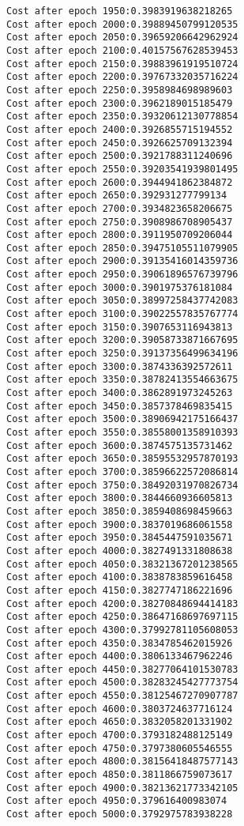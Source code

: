 \documentclass[11pt]{article}
\begin{document}
\begin{Verbatim}[commandchars=\\\{\}]
Cost after epoch 1950:0.3983919638218265
Cost after epoch 2000:0.39889450799120535
Cost after epoch 2050:0.39659206642962924
Cost after epoch 2100:0.40157567628539453
Cost after epoch 2150:0.39883961919510724
Cost after epoch 2200:0.39767332035716224
Cost after epoch 2250:0.3958984698989603
Cost after epoch 2300:0.3962189015185479
Cost after epoch 2350:0.39320612130778854
Cost after epoch 2400:0.3926855715194552
Cost after epoch 2450:0.3926625709132394
Cost after epoch 2500:0.3921788311240696
Cost after epoch 2550:0.39203541939801495
Cost after epoch 2600:0.3944941862384872
Cost after epoch 2650:0.392931277799134
Cost after epoch 2700:0.3934823658206675
Cost after epoch 2750:0.3908986708905437
Cost after epoch 2800:0.3911950709206044
Cost after epoch 2850:0.39475105511079905
Cost after epoch 2900:0.39135416014359736
Cost after epoch 2950:0.39061896576739796
Cost after epoch 3000:0.3901975376181084
Cost after epoch 3050:0.38997258437742083
Cost after epoch 3100:0.39022557835767774
Cost after epoch 3150:0.3907653116943813
Cost after epoch 3200:0.39058733871667695
Cost after epoch 3250:0.39137356499634196
Cost after epoch 3300:0.3874336392572611
Cost after epoch 3350:0.38782413554663675
Cost after epoch 3400:0.3862891973245263
Cost after epoch 3450:0.3857378469835415
Cost after epoch 3500:0.38906942175166437
Cost after epoch 3550:0.38558001358910393
Cost after epoch 3600:0.3874575135731462
Cost after epoch 3650:0.38595532957870193
Cost after epoch 3700:0.38596622572086814
Cost after epoch 3750:0.38492031970826734
Cost after epoch 3800:0.3844660936605813
Cost after epoch 3850:0.3859408698459663
Cost after epoch 3900:0.3837019686061558
Cost after epoch 3950:0.3845447591035671
Cost after epoch 4000:0.3827491331808638
Cost after epoch 4050:0.38321367201238565
Cost after epoch 4100:0.3838783859616458
Cost after epoch 4150:0.3827747186221696
Cost after epoch 4200:0.38270848694414183
Cost after epoch 4250:0.38647168697697115
Cost after epoch 4300:0.37992781105608053
Cost after epoch 4350:0.3834785462015926
Cost after epoch 4400:0.3806133467962246
Cost after epoch 4450:0.38277064101530783
Cost after epoch 4500:0.38283245427773754
Cost after epoch 4550:0.38125467270907787
Cost after epoch 4600:0.3803724637716124
Cost after epoch 4650:0.3832058201331902
Cost after epoch 4700:0.3793182488125149
Cost after epoch 4750:0.3797380605546555
Cost after epoch 4800:0.38156418487577143
Cost after epoch 4850:0.3811866759073617
Cost after epoch 4900:0.38213621773342105
Cost after epoch 4950:0.379616400983074
Cost after epoch 5000:0.3792975783938228

    \end{Verbatim}
\end{document}
